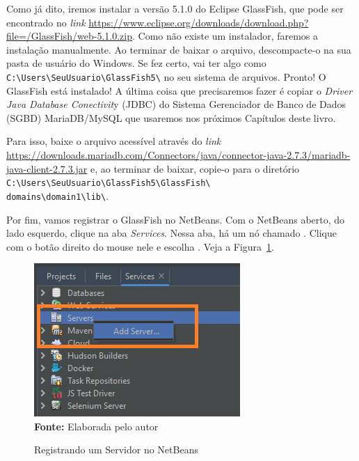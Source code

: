 Como já dito, iremos instalar a versão 5.1.0 do Eclipse GlassFish, que pode ser encontrado no \textit{link} 
\url{https://www.eclipse.org/downloads/download.php?file=/GlassFish/web-5.1.0.zip}. Como não existe um instalador, faremos a instalação manualmente. Ao terminar de baixar o arquivo, descompacte-o na sua pasta de usuário do Windows. Se fez certo, vai ter algo como \texttt{C:\textbackslash Users\textbackslash SeuUsuario\textbackslash GlassFish5\textbackslash} no seu sistema de arquivos. Pronto! O GlassFish está instalado! A última coisa que precisaremos fazer é copiar o \textit{Driver Java Database Conectivit}y (JDBC) do Sistema Gerenciador de Banco de Dados (SGBD) MariaDB/MySQL que usaremos nos próximos Capítulos deste livro.

Para isso, baixe o arquivo acessível através do \textit{link} \url{https://downloads.mariadb.com/Connectors/java/connector-java-2.7.3/mariadb-java-client-2.7.3.jar} e, ao terminar de baixar, copie-o para o diretório \texttt{C:\textbackslash Users\textbackslash SeuUsuario\textbackslash GlassFish5\textbackslash GlassFish\textbackslash\\domains\textbackslash domain1\textbackslash lib\textbackslash}.

Por fim, vamos registrar o GlassFish no NetBeans. Com o NetBeans aberto, do lado esquerdo, clique na aba \textit{Services}. Nessa aba, há um nó chamado . Clique com o botão direito do mouse nele e escolha . Veja a Figura~\ref{fig:cap01Servers}.

\FloatBarrier
\begin{figure}[!htbp]
    \centering
    \caption{Registrando um Servidor no NetBeans}
    \includegraphics[scale=0.7]{imagens/cap01Servers}
    \\\textbf{Fonte:} Elaborada pelo autor
    \label{fig:cap01Servers}
\end{figure}
\FloatBarrier

